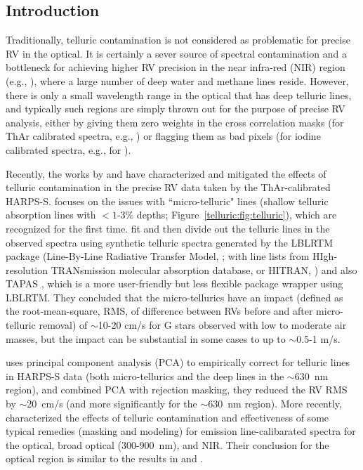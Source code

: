 \subsection{Introduction}\label{keck:telluric:intro}

Traditionally, telluric contamination is not considered as problematic
for precise RV in the optical. It is certainly a sever source of
spectral contamination and a bottleneck for achieving higher RV
precision in the near infra-red (NIR) region (e.g.,
\citealt{2010ApJ...713..410B}), where a large number of deep water and
methane lines reside. However, there is only a small wavelength
range in the optical that has deep telluric lines, and typically such
regions are simply thrown out for the purpose of precise RV analysis,
either by giving them zero weights in the cross correlation masks (for
ThAr calibrated spectra, e.g., \citealt{2002A&A...388..632P}) or
flagging them as bad pixels (for iodine calibrated spectra, e.g., for
\keck).

Recently, the works by \cite{artigau2014} and \cite{cunha2014} have
characterized and mitigated the effects of telluric contamination in
the precise RV data taken by the ThAr-calibrated HARPS-S.
\cite{cunha2014} focuses on the issues with ``micro-telluric" lines
(shallow telluric absorption lines with $<1$-3\% depths;
Figure~\ref{telluric:fig:telluric}), which are recognized for the
first time. \cite{cunha2014} fit and then divide out the telluric
lines in the observed spectra using synthetic telluric spectra
generated by the LBLRTM package (Line-By-Line Radiative Transfer
Model, \citealt{lblrtm}; with line lists from HIgh-resolution
TRANsmission molecular absorption database, or HITRAN,
\citealt{hitran2013}) and also TAPAS \citep{tapas}, which is a more
user-friendly but less flexible package wrapper using LBLRTM. They
concluded that the micro-tellurics have an impact (defined as the
root-mean-square, RMS, of difference between RVs before and after
micro-telluric removal) of $\sim$10-20 cm/s for G stars observed with
low to moderate air masses, but the impact can be substantial in some
cases to up to $\sim$0.5-1 m/s.

\cite{artigau2014} uses principal component analysis (PCA) to
empirically correct for telluric lines in HARPS-S data (both
micro-tellurics and the deep lines in the $\sim$630~nm region), and
combined PCA with rejection masking, they reduced the RV RMS by
$\sim$20~cm/s (and more significantly for the $\sim$630~nm
region). More recently, \cite{2016AAS...22713719S} characterized the
effects of telluric contamination and effectiveness of some typical
remedies (masking and modeling) for emission line-calibarated spectra
for the optical, broad optical (300-900~nm), and NIR. Their conclusion
for the optical region is similar to the results in \cite{artigau2014}
and \cite{cunha2014}.

